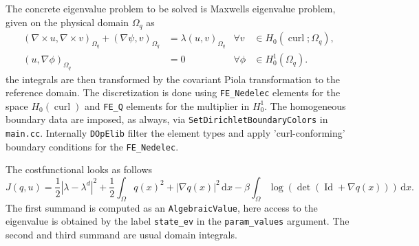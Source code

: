 The concrete eigenvalue problem to be solved is Maxwells eigenvalue problem, given on the physical domain $\Omega_q$ as
\begin{equation*}
\begin{aligned}
(\nabla \times u,\nabla \times v)_{\Omega_q} + (\nabla \psi,v)_{\Omega_q} &= \lambda (u,v)_{\Omega_q}& \forall v&\in H_0(\operatorname{curl};\Omega_q),\\
(u,\nabla \phi)_{\Omega_q} &=0 & \forall \phi &\in H^1_0(\Omega_q).
\end{aligned}
\end{equation*}
the integrals are then transformed by the covariant Piola transformation to the
reference domain.
The discretization is done using \texttt{FE\_Nedelec} elements for the space $H_0(\operatorname{curl})$
and \texttt{FE\_Q} elements for the multiplier in $H^1_0$. The homogeneous boundary data are imposed, as always, via
\texttt{SetDirichletBoundaryColors} in \texttt{main.cc}. Internally \texttt{DOpElib} filter the element types and apply 'curl-conforming'
boundary conditions for the \texttt{FE\_Nedelec}.

The costfunctional looks as follows
\[
        J(q,u) = \frac{1}{2} |\lambda-\lambda^d|^2 + \frac{1}{2}\int_{\Omega}q(x)^2+|\nabla q(x)|^2 \,\mathrm{d}x - \beta \int_{\Omega} \log(\det(\operatorname{Id}+\nabla q(x)))\,\mathrm{d}x. 
\]
The first summand is computed as an \texttt{AlgebraicValue}, here access to the eigenvalue is obtained by the label \texttt{state\_ev} in the \texttt{param\_values} argument.
The second and third summand are usual domain integrals. 


